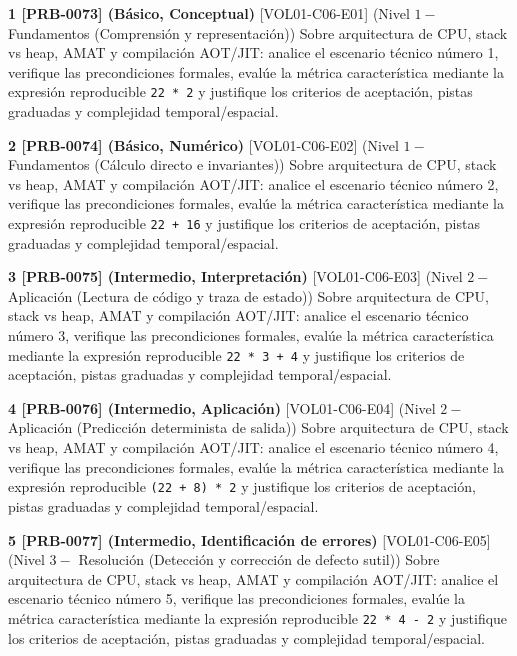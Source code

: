 \documentclass{book}
\begin{document}
\begin{tcolorbox}[title={Ejercicios}, studiumworked, breakable]

\noindent\textbf{1 [PRB-0073] (Básico, Conceptual)}
[VOL01-C06-E01] (Nivel \(1 -\) Fundamentos (Comprensión y representación)) Sobre arquitectura de CPU, stack vs heap, AMAT y compilación AOT/JIT: analice el escenario técnico número 1, verifique las precondiciones formales, evalúe la métrica característica mediante la expresión reproducible \texttt{22 * 2} y justifique los criterios de aceptación, pistas graduadas y complejidad temporal/espacial.

\noindent\textbf{2 [PRB-0074] (Básico, Numérico)}
[VOL01-C06-E02] (Nivel \(1 -\) Fundamentos (Cálculo directo e invariantes)) Sobre arquitectura de CPU, stack vs heap, AMAT y compilación AOT/JIT: analice el escenario técnico número 2, verifique las precondiciones formales, evalúe la métrica característica mediante la expresión reproducible \texttt{22 + 16} y justifique los criterios de aceptación, pistas graduadas y complejidad temporal/espacial.

\noindent\textbf{3 [PRB-0075] (Intermedio, Interpretación)}
[VOL01-C06-E03] (Nivel \(2 -\) Aplicación (Lectura de código y traza de estado)) Sobre arquitectura de CPU, stack vs heap, AMAT y compilación AOT/JIT: analice el escenario técnico número 3, verifique las precondiciones formales, evalúe la métrica característica mediante la expresión reproducible \texttt{22 * 3 + 4} y justifique los criterios de aceptación, pistas graduadas y complejidad temporal/espacial.

\noindent\textbf{4 [PRB-0076] (Intermedio, Aplicación)}
[VOL01-C06-E04] (Nivel \(2 -\) Aplicación (Predicción determinista de salida)) Sobre arquitectura de CPU, stack vs heap, AMAT y compilación AOT/JIT: analice el escenario técnico número 4, verifique las precondiciones formales, evalúe la métrica característica mediante la expresión reproducible \texttt{(22 + 8) * 2} y justifique los criterios de aceptación, pistas graduadas y complejidad temporal/espacial.

\noindent\textbf{5 [PRB-0077] (Intermedio, Identificación de errores)}
[VOL01-C06-E05] (Nivel \(3 -\) Resolución (Detección y corrección de defecto sutil)) Sobre arquitectura de CPU, stack vs heap, AMAT y compilación AOT/JIT: analice el escenario técnico número 5, verifique las precondiciones formales, evalúe la métrica característica mediante la expresión reproducible \texttt{22 * 4 - 2} y justifique los criterios de aceptación, pistas graduadas y complejidad temporal/espacial.


\end{tcolorbox}
\end{document}
